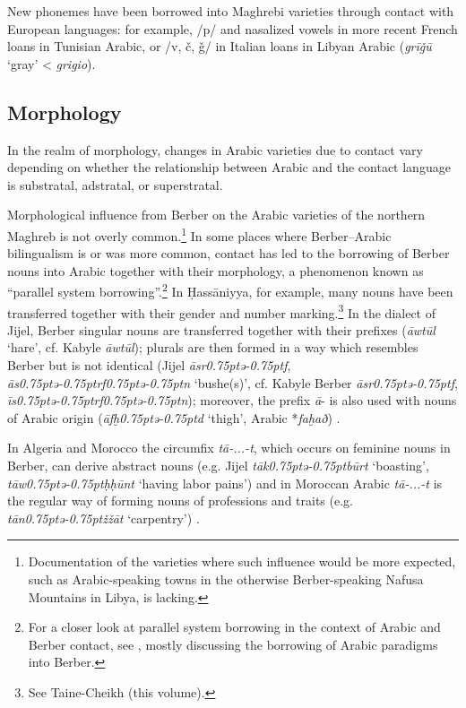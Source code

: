 \documentclass[output=paper]{langsci/langscibook}
\begin{document}
  New phonemes have been borrowed into Maghrebi varieties through contact with European languages: for example, /p/ and nasalized vowels in more recent French loans in Tunisian Arabic, or /v, č, ǧ/ in Italian loans in Libyan Arabic (\textit{grīǧū} ‘gray’ < \textit{grigio}).

  \subsection{Morphology}\label{Morphology}

In the realm of morphology, changes in Arabic varieties due to contact vary depending on whether the relationship between Arabic and the contact language is substratal, adstratal, or superstratal.

  Morphological influence from Berber on the Arabic varieties of the northern Maghreb is not overly common.\footnote{Documentation of the varieties where such influence would be more expected, such as Arabic-speaking towns in the otherwise Berber-speaking Nafusa Mountains in Libya, is lacking.} In some places where Berber--Arabic bilingualism is or was more common, contact has led to the borrowing of Berber nouns into Arabic together with their morphology, a phenomenon known as “parallel system borrowing”.\footnote{For a closer look at parallel system borrowing in the context of Arabic and Berber contact, see \citet{Kossmann2010}, mostly discussing the borrowing of Arabic paradigms into Berber.} In Ḥassāniyya, for example, many nouns have been transferred together with their gender and number marking.\footnote{See Taine-Cheikh (this volume).} In the dialect of Jijel, Berber singular nouns are transferred together with their prefixes (\textit{āwtūl} ‘hare’, cf. Kabyle \textit{āwtūl}); plurals are then formed in a way which resembles Berber but is not identical (Jijel \textit{āsr\kern 0.75ptǝ\kern -0.75ptf}, \textit{ās\kern 0.75ptǝ\kern -0.75ptrf\kern 0.75ptǝ\kern -0.75ptn} ‘bushe(s)’, cf. Kabyle Berber \textit{āsr\kern 0.75ptǝ\kern -0.75ptf}, \textit{īs\kern 0.75ptǝ\kern -0.75ptrf\kern 0.75ptǝ\kern -0.75ptn}); moreover, the prefix \textit{ā}{}- is also used with nouns of Arabic origin (\textit{āfḫ\kern 0.75ptǝ\kern -0.75ptd} ‘thigh’, Arabic *\textit{faḫað}) \citep[302–318]{Marçais1956}.

  In Algeria and Morocco the circumfix \textit{tā-...-t}, which occurs on feminine nouns in Berber, can derive abstract nouns (e.g. Jijel \textit{tāk\kern 0.75ptǝ\kern -0.75ptbūrt} ‘boasting’, \textit{tāw\kern 0.75ptǝ\kern -0.75ptḥḥūnt} ‘having labor pains’) and in Moroccan Arabic \textit{tā-...-t} is the regular way of forming nouns of professions and traits (e.g. \textit{tān\kern 0.75ptǝ\kern -0.75ptžžā{\R}t} ‘carpentry’) \citep{Kossmann2013chapter}.
\end{document}
